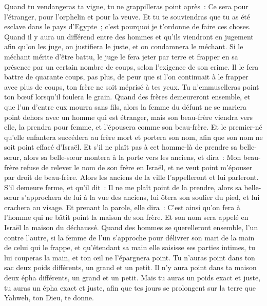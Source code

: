 \begin{multicols}{2}
Quand tu vendangeras ta vigne, tu ne grappilleras point après~: Ce sera pour l'étranger, pour l'orphelin et pour la veuve.
Et tu te souviendras que tu as été esclave dans le pays d'Egypte~; c'est pourquoi je t'ordonne de faire ces choses.
\VerseOne{}Quand il y aura un différend entre des hommes et qu'ils viendront en jugement afin qu'on les juge, on justifiera le juste, et on condamnera le méchant.
Si le méchant mérite d'être battu, le juge le fera jeter par terre et frapper en sa présence par un certain nombre de coups, selon l'exigence de son crime.
Il le fera battre de quarante coups, pas plus, de peur que si l'on continuait à le frapper avec plus de coups, ton frère ne soit méprisé à tes yeux.
Tu n'emmuselleras point ton bœuf lorsqu'il foulera le grain.
Quand des frères demeureront ensemble, et que l'un d'entre eux mourra sans fils, alors la femme du défunt ne se mariera point dehors avec un homme qui est étranger, mais son beau-frère viendra vers elle, la prendra pour femme, et l'épousera comme son beau-frère.
Et le premier-né qu'elle enfantera succédera au frère mort et portera son nom, afin que son nom ne soit point effacé d'Israël.
Et s'il ne plaît pas à cet homme-là de prendre sa belle-sœur, alors sa belle-sœur montera à la porte vers les anciens, et dira~: Mon beau-frère refuse de relever le nom de son frère en Israël, et ne veut point m'épouser par droit de beau-frère.
Alors les anciens de la ville l'appelleront et lui parleront. S'il demeure ferme, et qu'il dit~: Il ne me plaît point de la prendre,
alors sa belle-sœur s'approchera de lui à la vue des anciens, lui ôtera son soulier du pied, et lui crachera au visage. Et prenant la parole, elle dira~: C'est ainsi qu'on fera à l'homme qui ne bâtit point la maison de son frère.
Et son nom sera appelé en Israël la maison du déchaussé.
Quand des hommes se querelleront ensemble, l'un contre l'autre, si la femme de l'un s'approche pour délivrer son mari de la main de celui qui le frappe, et qu'étendant sa main elle saisisse ses parties intimes,
tu lui couperas la main, et ton œil ne l'épargnera point.
Tu n'auras point dans ton sac deux poids différents, un grand et un petit.
Il n'y aura point dans ta maison deux épha différents, un grand et un petit.
Mais tu auras un poids exact et juste, tu auras un épha exact et juste, afin que tes jours se prolongent sur la terre que Yahweh, ton Dieu, te donne.

\end{multicols}
